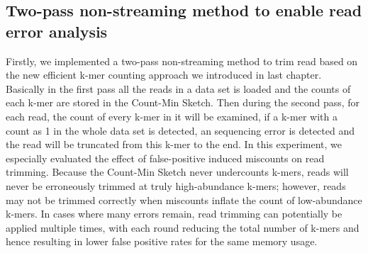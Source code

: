 \subsection{Two-pass non-streaming method to enable read error analysis}

Firstly, we implemented a two-pass non-streaming method to trim read based on
the new efficient k-mer counting approach we introduced in last chapter. 
Basically in the first pass all the reads in a data set is loaded and the counts of each k-mer are
stored in the Count-Min Sketch. Then during the second pass, for each read, the 
count of every k-mer in it will be examined, if a k-mer with a count as 1 in the 
whole data set is detected, an sequencing error is detected and
the read will be truncated from this k-mer to the end.
In this experiment, we especially evaluated the effect of false-positive induced miscounts on read
trimming.
Because the Count-Min Sketch never undercounts k-mers, reads will never be
erroneously trimmed at truly high-abundance k-mers; however, reads may not be
trimmed correctly when miscounts inflate the count of low-abundance k-mers.  In
cases where many errors remain, read trimming can potentially be applied
multiple times, with each round reducing the total number of k-mers and hence
resulting in lower false positive rates for the same memory usage.


